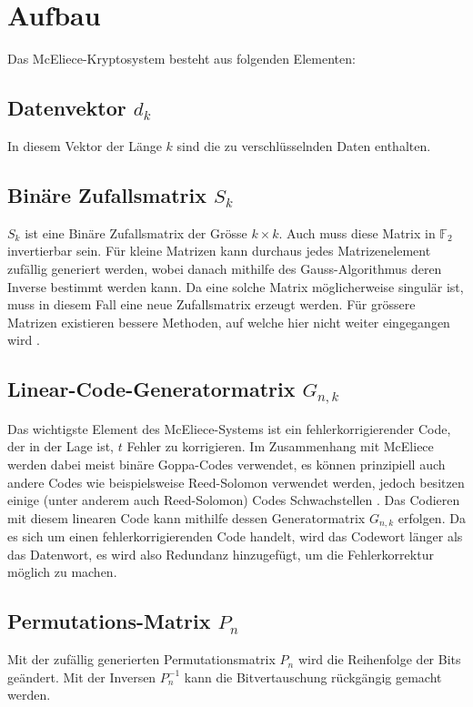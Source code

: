 %
%
%
\section{Aufbau\label{mceliece:section:Aufbau}}
Das McEliece-Kryptosystem besteht aus folgenden Elementen:

\subsection{Datenvektor $d_k$
\label{mceliece:subsection:d_k}}
In diesem Vektor der Länge $k$ sind die zu verschlüsselnden Daten enthalten.

\subsection{Binäre Zufallsmatrix $S_k$
\label{mceliece:subsection:s_k}}
$S_k$ ist eine Binäre Zufallsmatrix der Grösse $k \times k$.
Auch muss diese Matrix in $\mathbb{F}_2$ invertierbar sein.
Für kleine Matrizen kann durchaus jedes Matrizenelement zufällig generiert werden,
wobei danach mithilfe des Gauss-Algorithmus deren Inverse bestimmt werden kann.
Da eine solche Matrix möglicherweise singulär ist, muss in diesem Fall eine neue Zufallsmatrix erzeugt werden.
Für grössere Matrizen existieren bessere Methoden, auf welche hier nicht weiter eingegangen wird \cite{mceliece:GenerationRandMatrix}.

\subsection{Linear-Code-Generatormatrix $G_{n,k}$
\label{mceliece:subsection:g_nk}}
Das wichtigste Element des McEliece-Systems ist ein fehlerkorrigierender Code,
der in der Lage ist, $t$ Fehler zu korrigieren.
Im Zusammenhang mit McEliece werden dabei meist binäre Goppa-Codes \cite{mceliece:goppa} verwendet,
es können prinzipiell auch andere Codes wie beispielsweise Reed-Solomon verwendet werden,
jedoch besitzen einige (unter anderem auch Reed-Solomon) Codes Schwachstellen \cite{mceliece:lorenz}.
Das Codieren mit diesem linearen Code kann mithilfe dessen Generatormatrix $G_{n,k}$ erfolgen.
Da es sich um einen fehlerkorrigierenden Code handelt,
wird das Codewort länger als das Datenwort,
es wird also Redundanz hinzugefügt,
um die Fehlerkorrektur möglich zu machen.

\subsection{Permutations-Matrix $P_n$
\label{mceliece:subsection:p_n}}
Mit der zufällig generierten Permutationsmatrix $P_n$ wird die Reihenfolge der Bits geändert.
Mit der Inversen $P_n^{-1}$ kann die Bitvertauschung rückgängig gemacht werden.

